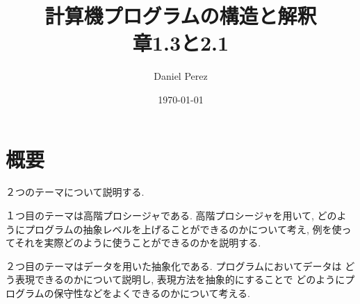 \documentclass[a4paper,11pt,fleqn]{article}
\author{Daniel Perez}
\date{\today}
\title{
  計算機プログラムの構造と解釈\\
  章1.3と2.1
}
\begin{document}
\maketitle
%
\section*{概要}
２つのテーマについて説明する.

１つ目のテーマは高階プロシージャである. 高階プロシージャを用いて,
どのようにプログラムの抽象レベルを上げることができるのかについて考え,
例を使ってそれを実際どのように使うことができるのかを説明する.

２つ目のテーマはデータを用いた抽象化である. プログラムにおいてデータは
どう表現できるのかについて説明し, 表現方法を抽象的にすることで
どのようにプログラムの保守性などをよくできるのかについて考える.
%

%

%
\end{document}
